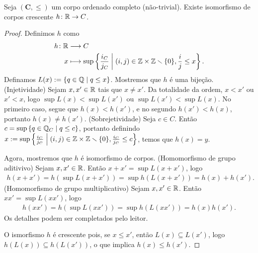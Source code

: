 \begin{proposition}
Seja $(\bm C,\leq)$ um corpo ordenado completo (não-trivial). Existe isomorfismo de corpos crescente  $h\colon \mathbb{R} \to C$.
\end{proposition}
\begin{proof}
Definimos $h$ como
	\begin{align*}
	{h}\colon {\mathbb{R}} &\longrightarrow {C} \\{x} &\longmapsto \sup \left\{{\frac{i_C}{j_C}}\;\middle\vert\;{(i,j) \in \mathbb{Z} \times \mathbb{Z} \smallsetminus \{0\}, \frac{i}{j} \leq x}\right\}.
	\end{align*}
Definamos $L(x) := \left\{{q \in \mathbb{Q}}\;\middle\vert\;{q \leq x}\right\}$. Mostremos que $h$ é uma bijeção. (Injetividade) Sejam $x,x' \in \mathbb{R}$ tais que $x \neq x'$. Da totalidade da ordem, $x < x'$ ou $x' < x$, logo $\sup L(x) < \sup L(x')$ ou $\sup L(x') < \sup L(x)$. No primeiro caso, segue que $h(x) < h(x')$, e no segundo $h(x') < h(x)$, portanto $h(x) \neq h(x')$. (Sobrejetividade) Seja $c \in C$. Então $c = \sup \left\{{q \in \mathbb{Q}_C}\;\middle\vert\;{q \leq c}\right\}$, portanto definindo $x := \sup \left\{{\frac{i_C}{j_C}}\;\middle\vert\;{(i,j) \in \mathbb{Z} \times \mathbb{Z} \smallsetminus \{0\}, \frac{i_C}{j_C} \leq c}\right\}$, temos que $h(x)=y$.

Agora, mostremos que $h$ é isomorfismo de corpos. (Homomorfismo de grupo aditivivo) Sejam $x,x' \in \mathbb{R}$. Então $x+x' = \sup L(x+x')$, logo
	\begin{align*}
	h(x+x') = h(\sup L(x+x')) = \sup h(L(x+x')) = h(x) + h(x').
	\end{align*}
(Homomorfismo de grupo multiplicativo) Sejam $x,x' \in \mathbb{R}$. Então $xx' = \sup L(xx')$, logo
	\begin{align*}
	h(xx') = h(\sup L(xx')) = \sup h(L(xx')) = h(x)h(x').
	\end{align*}
Os detalhes podem ser completados pelo leitor.

O ismorfismo $h$ é crescente pois, se $x \leq x'$, então $L(x) \subseteq L(x')$, logo $h(L(x)) \subseteq h(L(x'))$, o que implica $h(x) \leq h(x')$.
\end{proof}

